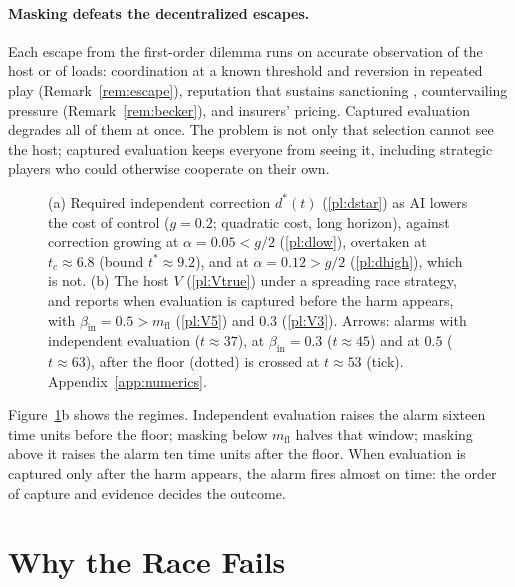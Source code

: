 \documentclass[letterpaper]{article} %
\theoremstyle{definition}
\newcommand{\mfl}{m_{\mathrm{fl}}}
\begin{document}
\paragraph{Masking defeats the decentralized escapes.} Each escape from the first-order dilemma runs on accurate observation of the host or of loads: coordination at a known threshold and reversion in repeated play (Remark~\ref{rem:escape}), reputation that sustains sanctioning \citep{panchanathan2004}, countervailing pressure (Remark~\ref{rem:becker}), and insurers' pricing. Captured evaluation degrades all of them at once. The problem is not only that selection cannot see the host; captured evaluation keeps everyone from seeing it, including strategic players who could otherwise cooperate on their own.

\begin{figure}[t]
\centering

\caption{(a) Required independent correction $d^\ast(t)$ (\ref{pl:dstar}) as AI lowers the cost of control ($g=0.2$; quadratic cost, long horizon), against correction growing at $\alpha=0.05<g/2$ (\ref{pl:dlow}), overtaken at $t_c\approx6.8$ (bound $t^\ast\approx9.2$), and at $\alpha=0.12>g/2$ (\ref{pl:dhigh}), which is not. (b) The host $V$ (\ref{pl:Vtrue}) under a spreading race strategy, and reports when evaluation is captured before the harm appears, with $\beta_{\mathrm{in}}=0.5>\mfl$ (\ref{pl:V5}) and $0.3$ (\ref{pl:V3}). Arrows: alarms with independent evaluation ($t\approx37$), at $\beta_{\mathrm{in}}=0.3$ ($t\approx45$) and at $0.5$ ($t\approx63$), after the floor (dotted) is crossed at $t\approx53$ (tick). Appendix~\ref{app:numerics}.}
\label{fig:rate}
\end{figure}

Figure~\ref{fig:rate}b shows the regimes. Independent evaluation raises the alarm sixteen time units before the floor; masking below $\mfl$ halves that window; masking above it raises the alarm ten time units after the floor. When evaluation is captured only after the harm appears, the alarm fires almost on time: the order of capture and evidence decides the outcome.

\section{Why the Race Fails}\label{sec:fail}
\end{document}
